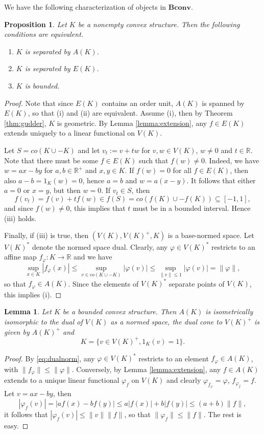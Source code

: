 \documentclass[12pt]{article}
\newtheorem{lemma}{Lemma}
\newtheorem{prop}{Proposition}
\theoremstyle{remark}
\newcommand{\<}{\langle}
\newcommand{\ct}[1]{\mathbf{#1}}
\begin{document}
We have the following characterization of objects in $\ct{Bconv}$.
\begin{prop}\label{prop:bounded} Let $K$ be a nonempty convex structure. Then the following conditions  are equivalent.
\begin{enumerate}
\item[(i)] $K$ is separated by $A(K)$.
\item[(ii)] $K$ is separated by $E(K)$.
\item[(iii)] $K$ is bounded.
\end{enumerate}

\end{prop}


\begin{proof} Note that since $E(K)$ contains an order unit, $A(K)$ is spanned by $E(K)$, so that (i) and (ii) are equivalent. Assume 
(i), then by Theorem \ref{thm:gudder}, $K$ is geometric. By Lemma \ref{lemma:extension}, any $f\in E(K)$ extends uniquely to a linear functional on $V(K)$. 

Let $S=co(K\cup -K)$ and let $v_t:=v+tw$ for $v,w\in V(K)$, $w\ne 0$ and $t\in \mathbb R$. 
Note that there must be some $f\in E(K)$ such that $f(w)\ne0$. Indeed, we have $w=ax-by$ for $a,b\in \mathbb R^+$ and $x,y\in K$. If $f(w)=0$ for all $f\in E(K)$, 
 then also $a-b=1_K(w)=0$, hence $a=b$ and $w=a(x-y)$. It follows that either $a=0$ or $x=y$, but then $w=0$. If $v_t\in S$, 
  then 
  \[
  f(v_t)=f(v)+tf(w)\in f(S)=co(f(K)\cup -f(K))\subseteq [-1,1],
  \]
   and since $f(w)\ne 0$, this implies that $t$ must be in a bounded interval. Hence (iii) holds. 

Finally, if (iii) is true, then $(V(K), V(K)^+, K)$ is a base-normed space. Let $V(K)^*$ denote the normed space dual. 
Clearly, any $\varphi\in V(K)^*$ restricts to an affine map 
$f_\varphi:K\to \mathbb R$ and  we have
\begin{equation}\label{eq:dualnorm}
\sup_{x\in K} |f_\varphi(x)|\le \sup_{v\in co(K\cup -K)}|\varphi(v)|\le \sup_{\|v\|\le 1}|\varphi(v)|=\|\varphi\|,
\end{equation}
so that $f_\varphi\in A(K)$. Since the elements of $V(K)^*$ separate points of $V(K)$, this implies (i).


\end{proof}


\begin{lemma} Let $K$ be a bounded convex structure. Then  $A(K)$ is isometrically isomorphic to the dual of $V(K)$ as a normed space,  the dual cone to $V(K)^+$ is given by $A(K)^+$ and 
\[
K=\{v\in V(K)^+, 1_K(v)=1\}.
\]
\end{lemma}

\begin{proof} By \eqref{eq:dualnorm}, any $\varphi\in V(K)^*$ restricts to an  element  
 $f_\varphi\in A(K)$, with $\|f_\varphi\|\le \|\varphi\|$.  Conversely, by Lemma \ref{lemma:extension}, any $f\in A(K)$ extends to a unique linear functional $\varphi_f$ on $V(K)$
and clearly $\varphi_{f_\varphi}=\varphi$, $f_{\varphi_f}=f$. Let $v=ax-by$, then
\[
|\varphi_f(v)|=|af(x)-bf(y)|\le a|f(x)|+b|f(y)|\le (a+b)\|f\|,
\]
it follows that $|\varphi_f(v)|\le \|v\|\|f\|$, so that $\|\varphi_f\|\le \|f\|$. The rest is easy.


\end{proof}
\end{document}
